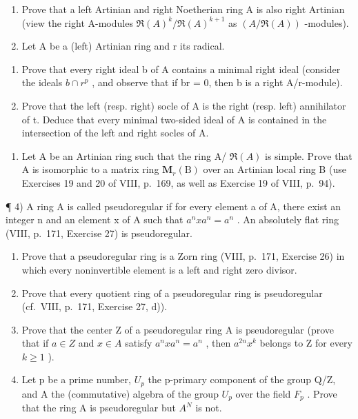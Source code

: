 
\begin{enumerate}
\def\labelenumi{\arabic{enumi})}
\item
  Prove that a left Artinian and right Noetherian ring A is also right Artinian (view the right A-modules \(\Re(A)^{k}/\Re(A)^{k+1}\) as \((A/\Re(A))\) -modules).
\item
  Let A be a (left) Artinian ring and r its radical.
\end{enumerate}

\begin{enumerate}
\def\labelenumi{\alph{enumi})}
\item
  Prove that every right ideal b of A contains a minimal right ideal (consider the ideals \(b \cap r^{p}\) , and observe that if br = 0, then b is a right A/r-module).
\item
  Prove that the left (resp. right) socle of A is the right (resp. left) annihilator of t. Deduce that every minimal two-sided ideal of A is contained in the intersection of the left and right socles of A.
\end{enumerate}

\begin{enumerate}
\def\labelenumi{\arabic{enumi})}
\setcounter{enumi}{2}
\tightlist
\item
  Let A be an Artinian ring such that the ring A/ \(\Re(A)\) is simple. Prove that A is isomorphic to a matrix ring \(\mathbf{M}_{r}(\mathrm{B})\) over an Artinian local ring B (use Exercises 19 and 20 of VIII, p.~169, as well as Exercise 19 of VIII, p.~94).
\end{enumerate}

¶ 4) A ring A is called pseudoregular if for every element a of A, there exist an integer n and an element x of A such that \(a^{n}xa^{n}=a^{n}\) . An absolutely flat ring (VIII, p.~171, Exercise 27) is pseudoregular.

\begin{enumerate}
\def\labelenumi{\alph{enumi})}
\item
  Prove that a pseudoregular ring is a Zorn ring (VIII, p.~171, Exercise 26) in which every noninvertible element is a left and right zero divisor.
\item
  Prove that every quotient ring of a pseudoregular ring is pseudoregular (cf.~VIII, p.~171, Exercise 27, d)).
\item
  Prove that the center Z of a pseudoregular ring A is pseudoregular (prove that if \(a \in Z\) and \(x \in A\) satisfy \(a^{n}xa^{n} = a^{n}\) , then \(a^{2n}x^{k}\) belongs to Z for every \(k \geqslant 1\) ).
\item
  Let p be a prime number, \(U_{p}\) the p-primary component of the group Q/Z, and A the (commutative) algebra of the group \(U_{p}\) over the field \(F_{p}\) . Prove that the ring A is pseudoregular but \(A^{N}\) is not.
\end{enumerate}


